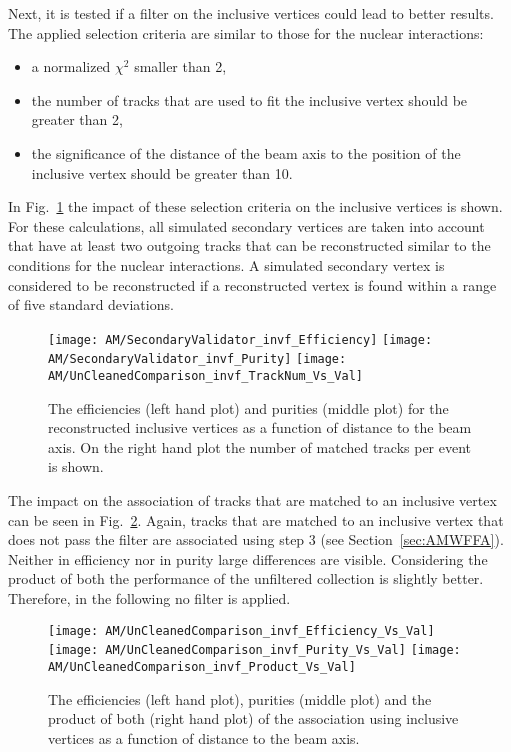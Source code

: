Next, it is tested if a filter on the inclusive vertices could lead to better results. The applied selection criteria are similar to those for the nuclear interactions:
\begin{itemize}
    \item a normalized $\chi^{2}$ smaller than 2,
    \item the number of tracks that are used to fit the inclusive vertex should be greater than 2,
    \item the significance of the distance of the beam axis to the position of the inclusive vertex should be greater than 10.
\end{itemize}

In Fig.~\ref{plot:AMWFSVinvfEffAndPurDC} the impact of these selection criteria on the inclusive vertices is shown. For these calculations, all simulated secondary vertices are taken into account that have at least two outgoing tracks that can be reconstructed similar to the conditions for the nuclear interactions. A simulated secondary vertex is considered to be reconstructed if a reconstructed vertex is found within a range of five standard deviations.

\begin{figure}[Ht]
    \centering
    \texttt{[image: AM/SecondaryValidator\_invf\_Efficiency]}
    \texttt{[image: AM/SecondaryValidator\_invf\_Purity]}
    \texttt{[image: AM/UnCleanedComparison\_invf\_TrackNum\_Vs\_Val]}
    \caption[Purity and efficiency of the reconstructed inclusive vertices as a function of distance to the beam axis and number of matched tracks]{The efficiencies (left hand plot) and purities (middle plot) for the reconstructed inclusive vertices as a function of distance to the beam axis. On the right hand plot the number of matched tracks per event is shown. \label{plot:AMWFSVinvfEffAndPurDC}}
\end{figure}

The impact on the association of tracks that are matched to an inclusive vertex can be seen in Fig.~\ref{plot:AMWFSVinvfEffAndPurRT}.  Again, tracks that are matched to an inclusive vertex that does not pass the filter are associated using step 3 (see Section~\ref{sec:AMWFFA}). Neither in efficiency nor in purity large differences are visible. Considering the product of both the performance of the unfiltered collection is slightly better. Therefore, in the following no filter is applied.

\begin{figure}[Ht]
    \centering
    \texttt{[image: AM/UnCleanedComparison\_invf\_Efficiency\_Vs\_Val]}
    \texttt{[image: AM/UnCleanedComparison\_invf\_Purity\_Vs\_Val]}
    \texttt{[image: AM/UnCleanedComparison\_invf\_Product\_Vs\_Val]}
    \caption[Efficiencies, purities and their product of the association using different inclusive vertex collection as a function of distance to the beam axis]{The efficiencies (left hand plot), purities (middle plot) and the product of both (right hand plot) of the association using inclusive vertices as a function of distance to the beam axis. \label{plot:AMWFSVinvfEffAndPurRT}}
\end{figure}

